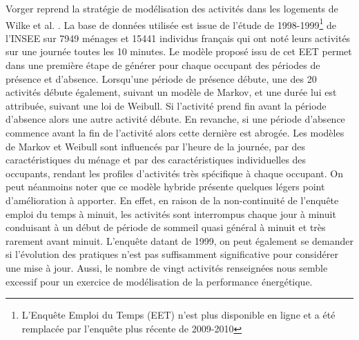 Vorger \cite{Vorger-14} reprend la stratégie de modélisation des activités dans les logements de Wilke et al. \cite{Wilke-13}. La base de données utilisée est issue de l'étude de 1998-1999\footnote{L'Enquête Emploi du Temps (EET) n'est plus disponible en ligne et a été remplacée par l'enquête plus récente de 2009-2010} de l'INSEE sur 7949 ménages et 15441 individus français qui ont noté leurs activités sur une journée toutes les 10 minutes. Le modèle proposé issu de cet EET permet dans une première étape de générer pour chaque occupant des périodes de présence et d'absence. Lorsqu'une période de présence débute, une des 20 activités débute également, suivant un modèle de Markov, et une durée lui est attribuée, suivant une loi de Weibull. Si l'activité prend fin avant la période d'absence alors une autre activité débute. En revanche, si une période d'absence commence avant la fin de l'activité alors cette dernière est abrogée. Les modèles de Markov et Weibull sont influencés par l'heure de la journée, par des caractéristiques du ménage et par des caractéristiques individuelles des occupants, rendant les profiles d'activités très spécifique à chaque occupant. On peut néanmoins noter que ce modèle hybride présente quelques légers point d'amélioration à apporter. En effet, en raison de la non-continuité de l'enquête emploi du temps à minuit, les activités sont interrompus chaque jour à minuit conduisant à un début de période de sommeil quasi général à minuit et très rarement avant minuit. L'enquête datant de 1999, on peut également se demander si l'évolution des pratiques n'est pas suffisamment significative pour considérer une mise à jour. Aussi, le nombre de vingt activités renseignées nous semble excessif pour un exercice de modélisation de la performance énergétique.

